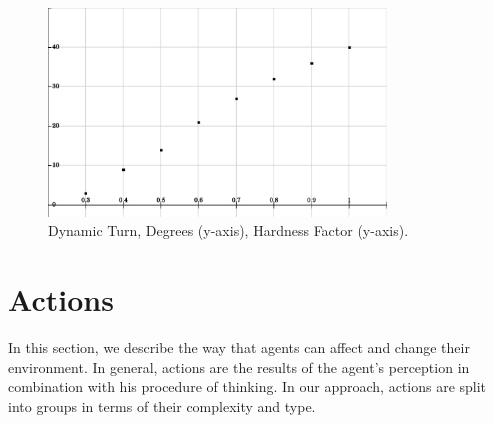 \begin{figure}[t!]
\centering
  \includegraphics[width=0.8\textwidth]{Chapter3/figures/DynamicTurn.pdf}
  \caption{Dynamic Turn, Degrees (y-axis), Hardness Factor (y-axis).}
  \label{fig:Turn}
\end{figure}


\section{Actions}
In this section, we describe the way that agents can affect and change their environment. In general, actions are the results of the agent's perception in combination with his procedure of thinking. In our approach, actions are split into groups in terms of their complexity and type.

